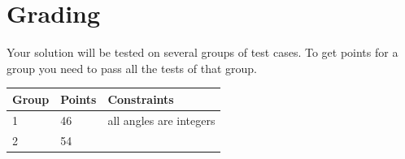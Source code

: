 \section*{Grading}
Your solution will be tested on several groups of test cases. To get points for a group you need to pass all the tests of that group.

\begin{tabular}{| l | l | l |}
	\hline
	Group & Points & Constraints\\ \hline
  1     & 46         & all angles are integers \\ \hline
  2     & 54         & \\ \hline
\end{tabular}
